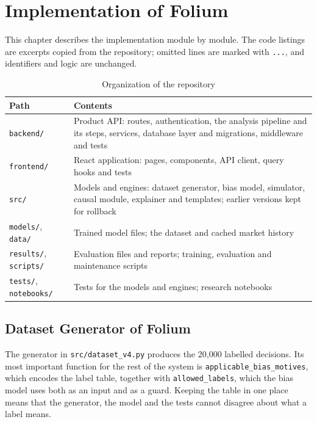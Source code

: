 \chapter{Implementation of Folium}
This chapter describes the implementation module by module. The code listings are excerpts copied from the repository; omitted lines are marked with \texttt{...}, and identifiers and logic are unchanged.

\begin{table}[H]
\centering
\small
\begin{tabularx}{\textwidth}{|P{2.6cm}|L|}
\hline
\textbf{Path} & \textbf{Contents} \\
\hline
\texttt{backend/} & Product API: routes, authentication, the analysis pipeline and its steps, services, database layer and migrations, middleware and tests \\
\hline
\texttt{frontend/} & React application: pages, components, API client, query hooks and tests \\
\hline
\texttt{src/} & Models and engines: dataset generator, bias model, simulator, causal module, explainer and templates; earlier versions kept for rollback \\
\hline
\texttt{models/}, \texttt{data/} & Trained model files; the dataset and cached market history \\
\hline
\texttt{results/}, \texttt{scripts/} & Evaluation files and reports; training, evaluation and maintenance scripts \\
\hline
\texttt{tests/}, \texttt{notebooks/} & Tests for the models and engines; research notebooks \\
\hline
\end{tabularx}
\caption{Organization of the repository}
\label{tab:repo}
\end{table}

\section{Dataset Generator of Folium}
The generator in \texttt{src/dataset\_v4.py} produces the 20,000 labelled decisions. Its most important function for the rest of the system is \texttt{applicable\_bias\_motives}, which encodes the label table, together with \texttt{allowed\_labels}, which the bias model uses both as an input and as a guard. Keeping the table in one place means that the generator, the model and the tests cannot disagree about what a label means.

